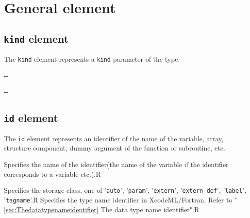 \section{General element}


\subsection{ {\tt kind} element}

The {\tt kind} element represents a {\tt kind} parameter of the type.


\begin{XcodeMLChildElements}
\XcodeMLElementDef{-}
{-}{-}
\end{XcodeMLChildElements}

\begin{XcodeMLAttributes}
\XcodeMLAttrDef{-}{-}
{-}{-}
\end{XcodeMLAttributes}


\subsection{ {\tt id} element}

The {\tt id} element represents an identifier of the name of the variable, array,
structure component, dummy argument of the function or subroutine, etc.


\begin{XcodeMLChildElements}
{Specifies the name of the identifier(the name of the variable if the identifier corresponds to a variable etc.).}{R}
\end{XcodeMLChildElements}

\begin{XcodeMLAttributes}
{Specifies the storage class, one of '{\tt auto}', '{\tt param}', '{\tt extern}', '{\tt extern\_def}', '{\tt label}', '{\tt tagname}'.}{R}
{Specifies the type name identifier in XcodeML/Fortran.
 Refer to "\ref{sec:Thedatatypenameidentifier} The data type name identifier".}{R}
\end{XcodeMLAttributes}

